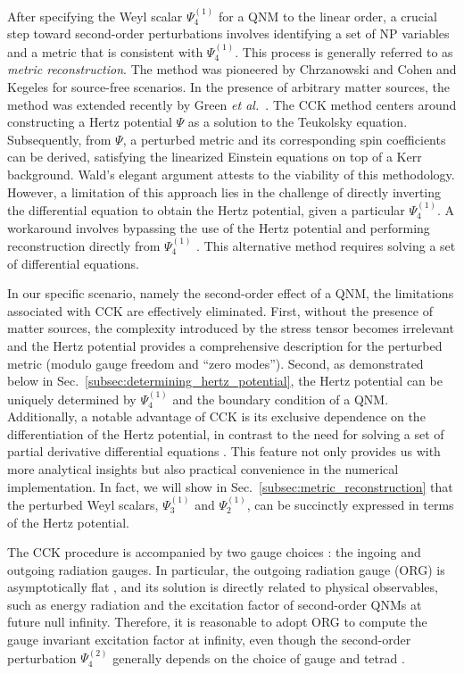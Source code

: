 \documentclass[aps,prd,amsmath,floats,floatfix, twocolumn,
superscriptaddress,nofootinbib,showpacs]{revtex4-1}
\newcommand{\etal}{\textit{et al.\ }}
\begin{document}
After specifying the Weyl scalar $\Psi_4^{(1)}$ for a QNM to the linear order, a crucial step toward second-order perturbations involves identifying a set of NP variables and a metric that is consistent with $\Psi_4^{(1)}$. This process is generally referred to as \textit{metric reconstruction}. The method was pioneered by Chrzanowski \cite{1975PhRvD..11.2042C} and Cohen and Kegeles \cite{COHEN19755,1979PhRvD..19.1641K} for source-free scenarios. In the presence of arbitrary matter sources, the method was extended recently by Green \etal \cite{Green:2019nam}. The CCK method centers around constructing a Hertz potential $\Psi$ as a solution to the Teukolsky equation. Subsequently, from $\Psi$, a perturbed metric and its corresponding spin coefficients can be derived, satisfying the linearized Einstein equations on top of a Kerr background. Wald's elegant argument \cite{PhysRevLett.41.203} attests to the viability of this methodology. However, a limitation of this approach lies in the challenge of directly inverting the differential equation to obtain the Hertz potential, given a particular $\Psi_4^{(1)}$. A workaround involves bypassing the use of the Hertz potential and performing reconstruction directly from $\Psi_4^{(1)}$ \cite{Loutrel:2020wbw, Ripley:2020xby}. This alternative method requires solving a set of differential equations.

In our specific scenario, namely the second-order effect of a QNM, the limitations associated with CCK are effectively eliminated. First, without the presence of matter sources, the complexity introduced by the stress tensor \cite{Green:2019nam} becomes irrelevant and the Hertz potential provides a comprehensive description for the perturbed metric (modulo gauge freedom and ``zero modes''). Second, as demonstrated below in Sec.~\ref{subsec:determining_hertz_potential}, the Hertz potential can be uniquely determined by $\Psi_4^{(1)}$ and the boundary condition of a QNM. Additionally, a notable advantage of CCK is its exclusive dependence on the differentiation of the Hertz potential, in contrast to the need for solving a set of partial derivative differential equations \cite{Loutrel:2020wbw, Ripley:2020xby}. This feature not only provides us with more analytical insights but also practical convenience in the numerical implementation. In fact, we will show in Sec.~\ref{subsec:metric_reconstruction} that the perturbed Weyl scalars, $\Psi_3^{(1)}$ and $\Psi_2^{(1)}$, can be succinctly expressed in terms of the Hertz potential.

The CCK procedure is accompanied by two gauge choices \cite{1975PhRvD..11.2042C}: the ingoing and outgoing radiation gauges. In particular, the outgoing radiation gauge (ORG) is asymptotically flat \cite{Campanelli:1998jv}, and its solution is directly related to physical observables, such as energy radiation and the excitation factor of second-order QNMs at future null infinity. Therefore, it is reasonable to adopt ORG to compute the gauge invariant excitation factor at infinity, even though the second-order perturbation $\Psi_4^{(2)}$ generally depends on the choice of gauge and tetrad \cite{Campanelli:1998jv}. 
\end{document}
